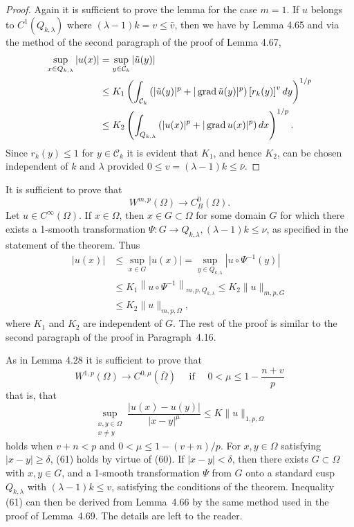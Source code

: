 \begin{proof}
  Again it is sufficient to prove the lemma for the case $m=1$.
  If $u$ belongs to $C^1\left(Q_{k, \lambda}\right)$ where $(\lambda-1) k=v \leq \bar{v}$,
  then we have by Lemma 4.65 and via the
  method of the second paragraph of the proof of Lemma 4.67,
  \[
  \begin{aligned}
  \sup _{x \in Q_{k, \lambda}}|u(x)| & =\sup _{y \in \mathcal{C}_k}|\tilde{u}(y)| \\
  & \leq K_1\left(\int_{\mathcal{C}_k}\left(|\tilde{u}(y)|^p+|\operatorname{grad} \tilde{u}(y)|^p\right)\left[r_k(y)\right]^v d y\right)^{1 / p} \\
  & \leq K_2\left(\int_{Q_{k, \lambda}}\left(|u(x)|^p+|\operatorname{grad} u(x)|^p\right) d x\right)^{1 / p} .
  \end{aligned}
  \]
  Since $r_k(y) \leq 1$ for $y \in \mathcal{C}_k$ it is evident that $K_1$, and hence $K_2$,
  can be chosen independent of $k$ and $\lambda$ provided $0 \leq v=(\lambda-1) k \leq \bar{\nu}$.
\end{proof}


\begin{para}
  It is sufficient to prove that
  \[
  W^{m, p}(\Omega) \rightarrow C_B^0(\Omega) .
  \]
  Let $u \in C^{\infty}(\Omega)$. If $x \in \Omega$, then $x \in G \subset \Omega$ for some domain $G$
  for which there exists a 1-smooth transformation $\Psi: G \rightarrow Q_{k, \lambda},(\lambda-1) k \leq \nu$, 
  as specified in the statement of the theorem. Thus
  \[
  \begin{aligned}
  |u(x)| & \leq \sup _{x \in G}|u(x)|=\sup _{y \in Q_{k, \lambda}}\left|u \circ \Psi^{-1}(y)\right| \\
  & \leq K_1\left\|u \circ \Psi^{-1}\right\|_{m, p, Q_{k, \lambda}} \leq K_2\|u\|_{m, p, G} \\
  & \leq K_2\|u\|_{m, p, \Omega},
  \end{aligned}
  \]
  where $K_1$ and $K_2$ are independent of $G$. The rest of the proof is similar
  to the second paragraph of the proof in Paragraph~4.16.
\end{para}

\begin{para}
  As in Lemma 4.28 it is sufficient to prove that
  \[
  W^{1, p}(\Omega) \rightarrow C^{0, \mu}(\overline{\Omega}) \quad \text { if } \quad 0<\mu \leq 1-\frac{n+v}{p}
  \]
  that is, that
  \[
  \sup _{\substack{x, y \in \Omega \\ x \neq y}} \frac{|u(x)-u(y)|}{|x-y|^\mu} \leq K\|u\|_{1, p, \Omega}
  \]
  holds when $v+n<p$ and $0<\mu \leq 1-(v+n) / p$. For $x, y \in \Omega$ satisfying $|x-y| \geq \delta$,
  (61) holds by virtue of (60). If $|x-y|<\delta$, then there exists $G \subset \Omega$ with $x, y \in G$,
  and a 1-smooth transformation $\Psi$ from $G$ onto a standard cusp $Q_{k, \lambda}$
  with $(\lambda-1) k \leq v$, satisfying the conditions of the theorem. Inequality (61)
  can then be derived from Lemma~4.66 by the same method used in the proof of Lemma~4.69.
  The details are left to the reader.
\end{para}